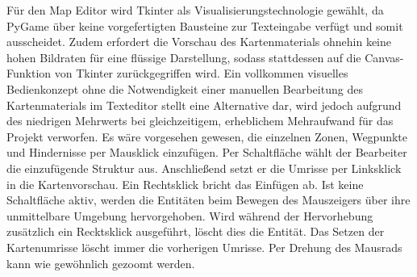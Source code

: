 Für den Map Editor wird Tkinter als Visualisierungstechnologie gewählt,
da PyGame über keine vorgefertigten Bausteine zur Texteingabe verfügt und somit
ausscheidet. Zudem erfordert die Vorschau des Kartenmaterials ohnehin keine hohen
Bildraten für eine flüssige Darstellung, sodass stattdessen auf die Canvas-Funktion
von Tkinter zurückgegriffen wird. Ein vollkommen visuelles Bedienkonzept ohne
die Notwendigkeit einer manuellen Bearbeitung des Kartenmaterials im Texteditor stellt
eine Alternative dar, wird jedoch aufgrund des niedrigen Mehrwerts bei gleichzeitigem,
erheblichem Mehraufwand für das Projekt verworfen.
Es wäre vorgesehen gewesen, die einzelnen Zonen, Wegpunkte und Hindernisse per Mausklick
einzufügen. Per Schaltfläche wählt der Bearbeiter die einzufügende Struktur aus.
Anschließend setzt er die Umrisse per Linksklick in die Kartenvorschau. Ein Rechtsklick
bricht das Einfügen ab. Ist keine Schaltfläche aktiv, werden die Entitäten beim Bewegen
des Mauszeigers über ihre unmittelbare Umgebung hervorgehoben. Wird während der
Hervorhebung zusätzlich ein Recktsklick ausgeführt, löscht dies die Entität. Das Setzen
der Kartenumrisse löscht immer die vorherigen Umrisse. Per Drehung des Mausrads
kann wie gewöhnlich gezoomt werden.\\
